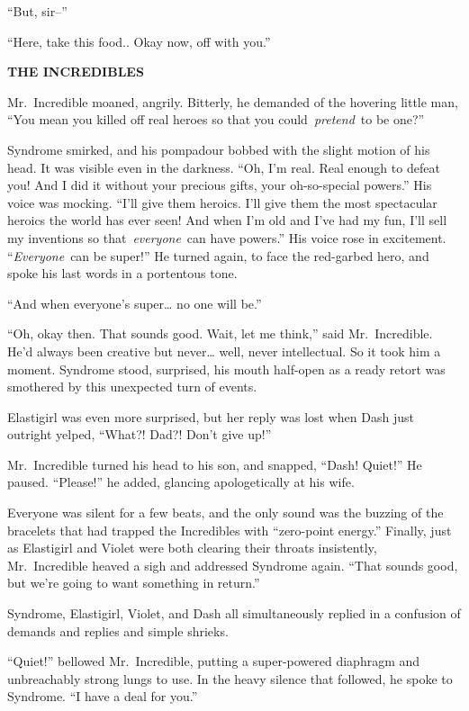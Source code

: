 ``But, sir--''

``Here, take this food.. Okay now, off with you.''\pagebreak

\textbf{THE INCREDIBLES}

Mr.~Incredible moaned, angrily. Bitterly, he demanded of the hovering
little man, ``You mean you killed off real heroes so that you
could~\emph{pretend}~to be one?''

Syndrome smirked, and his pompadour bobbed with the slight motion of his
head. It was visible even in the darkness. ``Oh, I'm real. Real enough
to defeat you! And I did it without your precious gifts, your
oh-so-special powers.'' His voice was mocking. ``I'll give them heroics.
I'll give them the most spectacular heroics the world has ever seen! And
when I'm old and I've had my fun, I'll sell my inventions so
that~\emph{everyone}~can have powers.'' His voice rose in excitement.
``\emph{Everyone}~can be super!'' He turned again, to face the
red-garbed hero, and spoke his last words in a portentous tone.

``And when everyone's super\ldots{} no one will be.''

``Oh, okay then. That sounds good. Wait, let me think,'' said
Mr.~Incredible. He'd always been creative but never\ldots{} well, never
intellectual. So it took him a moment. Syndrome stood, surprised, his
mouth half-open as a ready retort was smothered by this unexpected turn
of events.

Elastigirl was even more surprised, but her reply was lost when Dash
just outright yelped, ``What?! Dad?! Don't give up!''

Mr.~Incredible turned his head to his son, and snapped, ``Dash! Quiet!''
He paused. ``Please!'' he added, glancing apologetically at his wife.

Everyone was silent for a few beats, and the only sound was the buzzing
of the bracelets that had trapped the Incredibles with ``zero-point
energy.'' Finally, just as Elastigirl and Violet were both clearing
their throats insistently, Mr.~Incredible heaved a sigh and addressed
Syndrome again. ``That sounds good, but we're going to want something in
return.''

Syndrome, Elastigirl, Violet, and Dash all simultaneously replied in a
confusion of demands and replies and simple shrieks.

``Quiet!'' bellowed Mr.~Incredible, putting a super-powered diaphragm
and unbreachably strong lungs to use. In the heavy silence that
followed, he spoke to Syndrome. ``I have a deal for you.''


